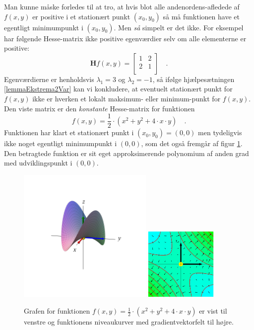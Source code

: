 \begin{think}
Man kunne måske forledes til at tro, at hvis blot alle andenordens-afledede af $f(x,y)$ er positive i et stationært punkt $(x_{0}, y_{0})$ så må funktionen have et egentligt minimumpunkt i $(x_{0}, y_{0})$. Men {\textit{så}} simpelt er det ikke. For eksempel har følgende Hesse-matrix ikke positive egenværdier selv om alle elementerne er positive:
\begin{equation}
\mathbf{H}f(x,y) = \left[
  \begin{array}{cc}
    1 & 2 \\
    2 & 1 \\
  \end{array}
\right] \quad .
\end{equation}
Egenværdierne er henholdsvis  $\lambda_{1} = 3$ og $\lambda_{2} = -1$, så ifølge hjælpesætningen \ref{lemmaEkstrema2Var} kan vi konkludere, at  eventuelt stationært punkt for $f(x,y)$ ikke er hverken et lokalt  maksimum- eller minimum-punkt for $f(x,y)$.\\

Den viste matrix er den {\textit{konstante}} Hesse-matrix for funktionen
\begin{equation}
f(x,y)= \frac{1}{2}\cdot \left(x^{2} + y^{2} + 4\cdot x \cdot y\right) \quad .
 \end{equation}
 Funktionen har klart et stationært punkt i $(x_{0}, y_{0}) = (0,0)$ men tydeligvis ikke noget egentligt minimumpunkt i $(0,0)$,  som det også fremgår af figur \ref{figPosHess}. Den betragtede funktion er sit eget approksimerende polynomium af anden grad med udviklingspunkt i $(0,0)$.
\end{think}

\begin{figure}[ht]
\centerline{ \includegraphics[height=65mm]{plotVar2Fig.pdf}  \includegraphics[height=35mm]{plotGrad.pdf} }
\begin{center}
\caption{Grafen for funktionen $f(x,y)= \frac{1}{2}\cdot \left(x^{2} + y^{2} + 4\cdot x \cdot y\right)$ er vist til venstre og funktionens niveaukurver med gradientvektorfelt til højre.} \label{figPosHess}
\end{center}
\end{figure}

